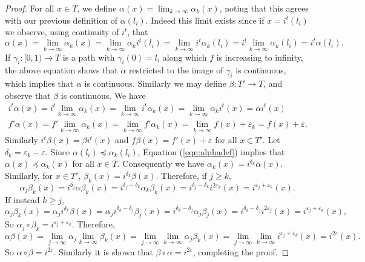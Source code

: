 \documentclass{article}
\theoremstyle{definition}
\renewcommand{\epsilon}{\varepsilon}
\begin{document}
\begin{proof}
    For all $x\in T$, we define $\alpha(x) = \lim_{k \to \infty} \alpha_k(x)$, noting that this agrees with our previous definition of $\alpha(l_i)$. Indeed this limit exists since if $x = i^t(l_i)$ we observe, using continuity of $i^t$, that
    \begin{equation}
        \label{eqn:alphadef}
        \alpha(x) = \lim_{k \to \infty} \alpha_k(x) =\lim_{k\to \infty} \alpha_k i^t(l_i) = \lim_{k\to \infty} i^t \alpha_k(l_i) = i^t\lim_{k\to \infty} \alpha_k(l_i) = i^t\alpha(l_i).
    \end{equation}
    If $\gamma_i:[0,1) \to T$ is a path with $\gamma_i(0) = l_i$ along which $f$ is increasing to infinity, the above equation shows that $\alpha$ restricted to the image of $\gamma_i$ is continuous, which implies that $\alpha$ is continuous.
    Similarly we may define $\beta:T' \to T$, and observe that $\beta$ is continuous.
    We have
    \begin{align*}
        i^t \alpha(x) = i^t\lim_{k \to \infty}\alpha_k(x) = \lim_{k \to \infty}i^{t}\alpha_k(x) = \lim_{k \to \infty} \alpha_ki^t(x) = \alpha i^t(x)\\
        f' \alpha(x) = f'\lim_{k \to \infty}\alpha_k(x) = \lim_{k \to \infty}f'\alpha_k(x) = \lim_{k \to \infty} f(x) + \epsilon_k = f(x) + \epsilon.
    \end{align*}
    Similarly $i^t\beta(x) = \beta i^t(x)$ and $f\beta(x) = f'(x) + \epsilon$ for all $x \in T'$.
    Let $\delta_k = \epsilon_k - \epsilon$. Since $\alpha(l_i) \preceq \alpha_k(l_i)$, Equation (\ref{eqn:alphadef}) implies that $\alpha(x) \preceq \alpha_k(x)$ for all $x\in T$. Consequently we have $\alpha_k(x) = i^{\delta_k}\alpha(x)$. Similarly, for $x\in T'$, $\beta_k(x) = i^{\delta_k}\beta(x)$. Therefore, if $j \geq k$,
    \begin{equation*}
        \alpha_j\beta_k(x) = i^{\delta_j}\alpha \beta_k(x) = i^{\delta_j - \delta_k}\alpha_k\beta_k(x) = i^{\delta_j - \delta_k}i^{2\epsilon_k}(x) = i^{\epsilon_j +\epsilon_k}(x).
    \end{equation*}
    If instead $k \geq j$,
    \begin{equation*}
        \alpha_j\beta_k(x) = \alpha_ji^{\delta_k}\beta(x) = \alpha_ji^{\delta_k-\delta_j}\beta_j(x)= i^{\delta_k-\delta_j}\alpha_j\beta_j(x) = i^{\delta_k - \delta_j}i^{2\epsilon_j}(x) = i^{\epsilon_j + \epsilon_k}(x),
    \end{equation*}
    So $\alpha_j \circ \beta_k = i^{\epsilon_j + \epsilon_k}$. Therefore,
    \begin{equation*}
        \alpha\beta(x) = \lim_{j\to\infty}\alpha_j \lim_{k\to \infty} \beta_k(x) = \lim_{j\to \infty}\lim_{k \to \infty} \alpha_j\beta_k(x) = \lim_{j\to \infty}\lim_{k \to \infty} i^{\epsilon_j + \epsilon_k}(x) = i^{2\epsilon}(x).
    \end{equation*}
    So $\alpha \circ \beta = i^{2\epsilon}$. Similarly it is shown that $\beta \circ \alpha = i^{2\epsilon}$, completing the proof.
\end{proof}
\end{document}
